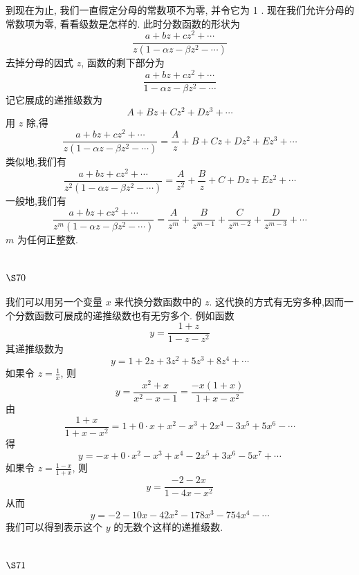 到现在为止, 我们一直假定分母的常数项不为零, 并令它为 1 . 现在我们允许分母的 常数项为零, 看看级数是怎样的. 此时分数函数的形状为
\[
\frac{a+b z+c z^{2}+\cdots}{z\left(1-\alpha z-\beta z^{2}-\cdots\right)}
\]
去掉分母的因式 $z$, 函数的剩下部分为
\[
\frac{a+b z+c z^{2}+\cdots}{1-\alpha z-\beta z^{2}-\cdots}
\]
记它展成的递推级数为
\[
A+B z+C z^{2}+D z^{3}+\cdots
\]
用 $z$ 除,得
\[
\frac{a+b z+c z^{2}+\cdots}{z\left(1-\alpha z-\beta z^{2}-\cdots\right)}=\frac{A}{z}+B+C z+D z^{2}+E z^{3}+\cdots
\]
类似地,我们有
\[
\frac{a+b z+c z^{2}+\cdots}{z^{2}\left(1-\alpha z-\beta z^{2}-\cdots\right)}=\frac{A}{z^{2}}+\frac{B}{z}+C+D z+E z^{2}+\cdots
\]
一般地,我们有
\[
\frac{a+b z+c z^{2}+\cdots}{z^{m}\left(1-\alpha z-\beta z^{2}-\cdots\right)}=\frac{A}{z^{m}}+\frac{B}{z^{m-1}}+\frac{C}{z^{m-2}}+\frac{D}{z^{m-3}}+\cdots
\]
$m$ 为任何正整数. 

\section{$\S 70$}

我们可以用另一个变量 $x$ 来代换分数函数中的 $z$. 这代换的方式有无穷多种,因而一 个分数函数可展成的递推级数也有无穷多个. 例如函数
\[
y=\frac{1+z}{1-z-z^{2}}
\]
其递推级数为
\[
y=1+2 z+3 z^{2}+5 z^{3}+8 z^{4}+\cdots
\]
如果令 $z=\frac{1}{x}$, 则
\[
y=\frac{x^{2}+x}{x^{2}-x-1}=\frac{-x(1+x)}{1+x-x^{2}}
\]
由
\[
\frac{1+x}{1+x-x^{2}}=1+0 \cdot x+x^{2}-x^{3}+2 x^{4}-3 x^{5}+5 x^{6}-\cdots
\]
得
\[
y=-x+0 \cdot x^{2}-x^{3}+x^{4}-2 x^{5}+3 x^{6}-5 x^{7}+\cdots
\]
如果令 $z=\frac{1-x}{1+x}$, 则
\[
y=\frac{-2-2 x}{1-4 x-x^{2}}
\]
从而
\[
y=-2-10 x-42 x^{2}-178 x^{3}-754 x^{4}-\cdots
\]
我们可以得到表示这个 $y$ 的无数个这样的递推级数.

\section{$\S 71$}

